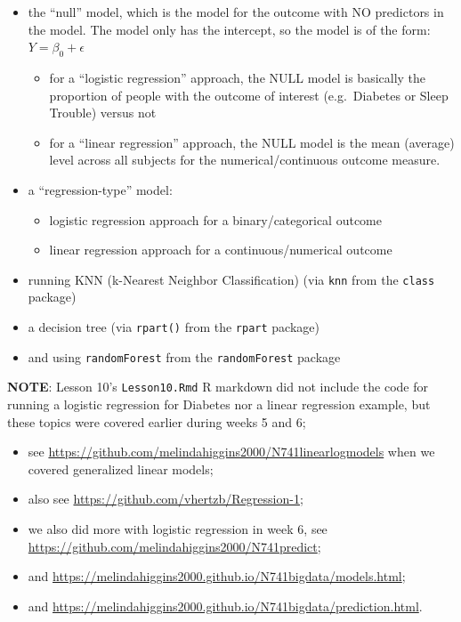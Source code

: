 \documentclass[]{article}
\providecommand{\tightlist}{%
  \setlength{\itemsep}{0pt}\setlength{\parskip}{0pt}}
\begin{document}
\begin{itemize}
\tightlist
\item
  the ``null'' model, which is the model for the outcome with NO
  predictors in the model. The model only has the intercept, so the
  model is of the form: \(Y = \beta_0 + \epsilon\)

  \begin{itemize}
  \tightlist
  \item
    for a ``logistic regression'' approach, the NULL model is basically
    the proportion of people with the outcome of interest (e.g.~Diabetes
    or Sleep Trouble) versus not
  \item
    for a ``linear regression'' approach, the NULL model is the mean
    (average) level across all subjects for the numerical/continuous
    outcome measure.
  \end{itemize}
\item
  a ``regression-type'' model:

  \begin{itemize}
  \tightlist
  \item
    logistic regression approach for a binary/categorical outcome
  \item
    linear regression approach for a continuous/numerical outcome
  \end{itemize}
\item
  running KNN (k-Nearest Neighbor Classification) (via \texttt{knn} from
  the \texttt{class} package)
\item
  a decision tree (via \texttt{rpart()} from the \texttt{rpart} package)
\item
  and using \texttt{randomForest} from the \texttt{randomForest} package
\end{itemize}

\textbf{NOTE}: Lesson 10's \texttt{Lesson10.Rmd} R markdown did not
include the code for running a logistic regression for Diabetes nor a
linear regression example, but these topics were covered earlier during
weeks 5 and 6;

\begin{itemize}
\tightlist
\item
  see \url{https://github.com/melindahiggins2000/N741linearlogmodels}
  when we covered generalized linear models;
\item
  also see \url{https://github.com/vhertzb/Regression-1};
\item
  we also did more with logistic regression in week 6, see
  \url{https://github.com/melindahiggins2000/N741predict};
\item
  and
  \url{https://melindahiggins2000.github.io/N741bigdata/models.html};
\item
  and
  \url{https://melindahiggins2000.github.io/N741bigdata/prediction.html}.
\end{itemize}
\end{document}
